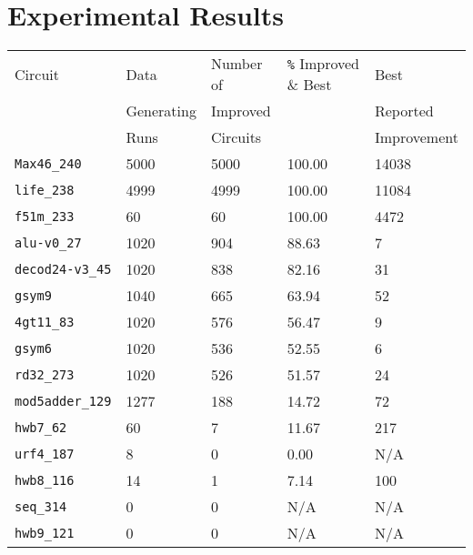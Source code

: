 \section{Experimental Results}

\begin{table}
    \begin{tabular}{l | l | l | l | l}
    Circuit & Data       & Number of & \verb!%! Improved & Best      \\
            & Generating & Improved  &                   & Reported   \\
            & Runs       & Circuits  &                   & Improvement \\ \hline
    \verb!Max46_240!     & 5000                 & 5000                        & 100.00    & 14038                     \\
    \verb!life_238!      & 4999                 & 4999                        & 100.00    & 11084                     \\
    \verb!f51m_233!    & 60                   & 60                          & 100.00    & 4472                      \\
    \verb!alu-v0_27!     & 1020                 & 904                         & 88.63     & 7                         \\
    \verb!decod24-v3_45! & 1020                 & 838                         & 82.16     & 31                        \\
    \verb!gsym9!         & 1040                 & 665                         & 63.94     & 52                        \\
    \verb!4gt11_83!      & 1020                 & 576                         & 56.47     & 9                         \\
    \verb!gsym6!         & 1020                 & 536                         & 52.55     & 6                         \\
    \verb!rd32_273!      & 1020                 & 526                         & 51.57     & 24                        \\
    \verb!mod5adder_129! & 1277                 & 188                         & 14.72     & 72                        \\
    \verb!hwb7_62!       & 60                   & 7                           & 11.67     & 217                       \\
    \verb!urf4_187!      & 8                    & 0                           & 0.00      & N/A                       \\
    \verb!hwb8_116!      & 14                   & 1                           & 7.14      & 100                       \\
    \verb!seq_314!      & 0                    & 0                           & N/A       & N/A                       \\
    \verb!hwb9_121!      & 0                    & 0                           & N/A       & N/A                       \\
    \end{tabular}
\end{table}


